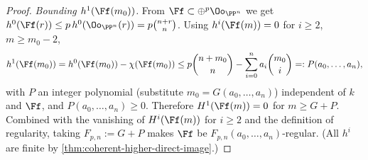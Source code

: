 \begin{proof}
  \emph{Bounding $h^1(\Ff(m_0))$.} From $\Ff\subset\oplus^p\Oo_{\PP^n}$ we get
  $h^0(\Ff(r))\le p\,h^0(\Oo_{\PP^n}(r)) = p\binom{n+r}{n}$. Using
  $h^i(\Ff(m))=0$ for $i\ge2$, $m\ge m_0-2$,
  \[
    h^1(\Ff(m_0)) = h^0(\Ff(m_0))-\chi(\Ff(m_0))
      \le p\binom{n+m_0}{n} - \sum_{i=0}^n a_i\binom{m_0}{i}
      =: P(a_0,\dots,a_n),
  \]
  with $P$ an integer polynomial (substitute $m_0=G(a_0,\dots,a_n)$) independent
  of $k$ and $\Ff$, and $P(a_0,\dots,a_n)\ge0$. Therefore $H^1(\Ff(m))=0$ for
  $m\ge G+P$. Combined with the vanishing of $H^i(\Ff(m))$ for $i\ge2$ and the
  definition of regularity, taking $F_{p,n} := G + P$ makes $\Ff$ be
  $F_{p,n}(a_0,\dots,a_n)$-regular. (All $h^i$ are finite by
  \cref{thm:coherent-higher-direct-image}.)
\end{proof}
